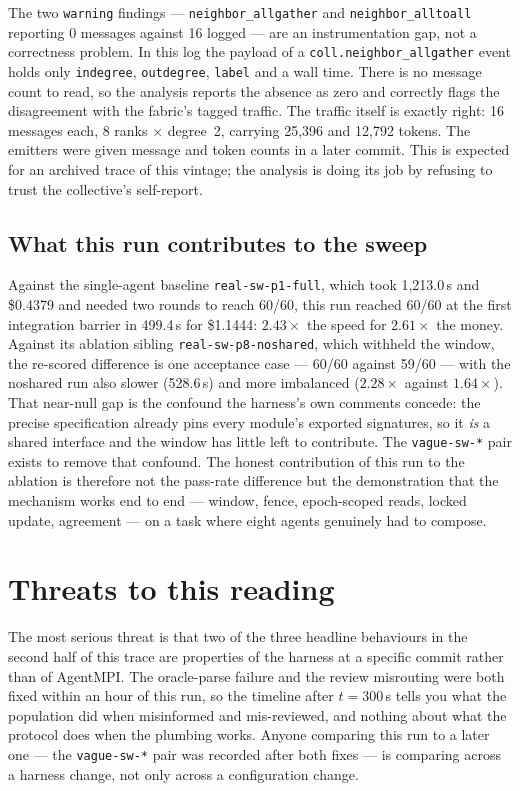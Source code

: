 \documentclass[11pt]{article}
\begin{document}
The two \texttt{warning} findings --- \texttt{neighbor\_allgather} and
\texttt{neighbor\_alltoall} reporting 0 messages against 16 logged --- are an instrumentation
gap, not a correctness problem. In this log the payload of a
\texttt{coll.neighbor\_allgather} event holds only \texttt{indegree}, \texttt{outdegree},
\texttt{label} and a wall time. There is no message count to read, so the analysis reports the absence as
zero and correctly flags the disagreement with the fabric's tagged traffic. The traffic itself
is exactly right: 16 messages each, $8$ ranks $\times$ degree~2, carrying 25{,}396 and 12{,}792
tokens. The emitters were given message and token counts in a later commit. This is expected
for an archived trace of this vintage; the analysis is doing its job by refusing to trust the
collective's self-report.

\subsection*{What this run contributes to the sweep}

Against the single-agent baseline \texttt{real-sw-p1-full}, which took 1{,}213.0\,s and
\$0.4379 and needed two rounds to reach 60/60, this run reached 60/60 at the first integration
barrier in 499.4\,s for \$1.1444: $2.43\times$ the speed for $2.61\times$ the money. Against
its ablation sibling \texttt{real-sw-p8-noshared}, which withheld the window, the re-scored
difference is one acceptance case --- 60/60 against 59/60 --- with the noshared run also
slower (528.6\,s) and more imbalanced ($2.28\times$ against $1.64\times$). That near-null gap
is the confound the harness's own comments concede: the precise specification already pins
every module's exported signatures, so it \emph{is} a shared interface and the window has
little left to contribute. The \texttt{vague-sw-*} pair exists to remove that confound. The
honest contribution of this run to the ablation is therefore not the pass-rate difference but
the demonstration that the mechanism works end to end --- window, fence, epoch-scoped reads,
locked update, agreement --- on a task where eight agents genuinely had to compose.

\section{Threats to this reading}

The most serious threat is that two of the three headline behaviours in the second half of
this trace are properties of the harness at a specific commit rather than of AgentMPI. The
oracle-parse failure and the review misrouting were both fixed within an hour of this run, so
the timeline after $t=300$\,s tells you what the population did when misinformed and
mis-reviewed, and nothing about what the protocol does when the plumbing works. Anyone
comparing this run to a later one --- the \texttt{vague-sw-*} pair was recorded after both
fixes --- is comparing across a harness change, not only across a configuration change.
\end{document}
